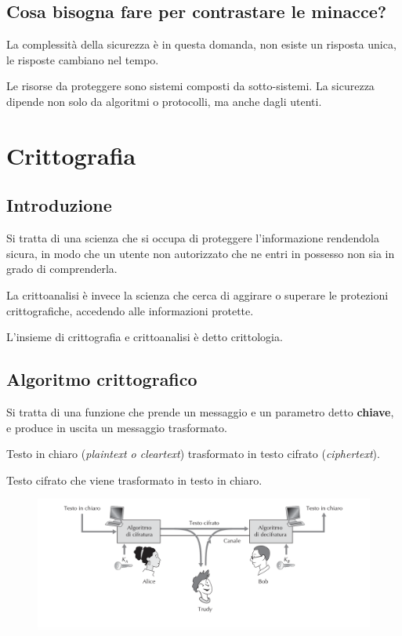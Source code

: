 \documentclass[oneside,a4paper,11pt]{book}
\theoremstyle{italicstyle}
\theoremstyle{normStyle}
\begin{document}
\section{Cosa bisogna fare per contrastare le minacce?}
La complessità della sicurezza è in questa domanda, non esiste un risposta 
unica, le risposte cambiano nel tempo.

Le risorse da proteggere sono sistemi composti da sotto-sistemi. La sicurezza dipende 
non solo da algoritmi o protocolli, ma anche dagli utenti.
%
%
\chapter{Crittografia}
\section{Introduzione}
Si tratta di una scienza che si occupa di proteggere l'informazione rendendola 
sicura, in modo che un utente non autorizzato che ne entri in possesso non sia 
in grado di comprenderla.

La crittoanalisi è invece la scienza che cerca di aggirare o superare le protezioni crittografiche, accedendo alle 
informazioni protette.

L'insieme di crittografia e crittoanalisi è detto crittologia.
\section{Algoritmo crittografico}
Si tratta di una funzione  che prende un messaggio e un parametro detto 
\textbf{chiave}, e produce in uscita un messaggio trasformato.
\begin{tcolorbox}[title = {Cifratura}]
  Testo in chiaro (\textit{plaintext o cleartext}) trasformato in testo cifrato 
  (\textit{ciphertext}).
\end{tcolorbox} 
\begin{tcolorbox}[title = {Decifratura}]
  Testo cifrato che viene trasformato in testo in chiaro.
\end{tcolorbox} 
\begin{figure}[H]
  \centering
  \includegraphics[width=12cm]{src/cifratura.png}
\end{figure}
\end{document}
